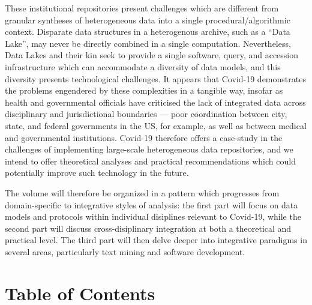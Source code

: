 \documentclass{statsoc}
\newcommand{\p}[1]{

\vspace{.75em}#1}
\newcommand{\q}[1]{{\fontfamily{qcr}\selectfont ``}#1{\fontfamily{qcr}\selectfont ''}}
\begin{document}
\p{These institutional repositories present 
challenges which are different from granular 
syntheses of heterogeneous data into a single 
procedural/algorithmic context.  Disparate data structures 
in a heterogenous archive, such as a \q{Data Lake}, may 
never be directly combined in a single computation.  
Nevertheless, Data Lakes and their kin seek to 
provide a single software, query, and accession infrastructure 
which can accommodate a diversity of data models, and 
this diversity presents technological challenges.  
It appears that Covid-19 demonstrates the problems 
engendered by these complexities in a tangible way, 
insofar as health and governmental officials have criticised 
the lack of integrated data across disciplinary and 
jurisdictional boundaries --- poor coordination between 
city, state, and federal governments in the US, for 
example, as well as between medical and governmental institutions.  
Covid-19 therefore offers a case-study in the challenges 
of implementing large-scale heterogeneous data repositories, 
and we intend to offer theoretical analyses and practical 
recommendations which could potentially improve such 
technology in the future.} 

\p{The volume will therefore be organized in a pattern 
which progresses from domain-specific to integrative 
styles of analysis: the first part will focus on data 
models and protocols within individual disiplines 
relevant to Covid-19, while the second part will discuss 
cross-disiplinary integration at both a theoretical and 
practical level.  The third part will then delve deeper 
into integrative paradigms in several areas, particularly 
text mining and software development.}  

\section{Table of Contents}
\end{document}
